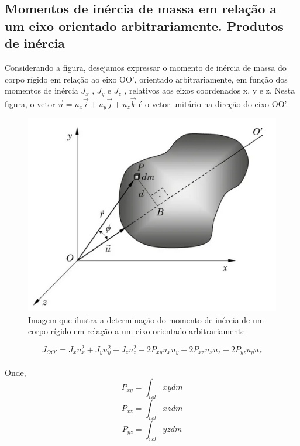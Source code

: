\documentclass[a4paper, 12pt]{article}
\begin{document}
	\subsection{Momentos de inércia de massa em relação a um eixo orientado arbitrariamente. Produtos de inércia}
		Considerando a figura, desejamos expressar o momento de inércia de massa do corpo rígido em relação ao eixo OO', orientado arbitrariamente, em função dos momentos de inércia $J_x$ , $J_y$ e $J_z$ , relativos aos eixos coordenados x, y e z. Nesta figura, o vetor $\vec{u}= u_x \vec{i}+ u_y\vec{j} + u_z\vec{k}$ é o vetor unitário na direção do eixo OO'.
		\begin{figure}[h]
			\center
			\includegraphics[scale=0.5]{imagens/a4.png} 
			\caption{Imagem que ilustra a determinação do momento de inércia de um corpo rígido em relação a um eixo orientado arbitrariamente}
		\end{figure}	
		\begin{equation}
			J_{OO'} = J_xu_x^2 + J_yu_y^2 + J_zu_z^2 - 2 P_{xy}u_xu_y- 2 P_{xz}u_xu_z - 2 P_{yz}u_yu_z
		\end{equation}
		\\
		
		Onde,
		\begin{equation}
			P_{xy} = \int_{vol} xydm
		\end{equation}
		\begin{equation}
			P_{xz} = \int_{vol} xzdm
		\end{equation}
		\begin{equation}
			P_{yz} = \int_{vol} yzdm
		\end{equation}\\
		
\end{document}
